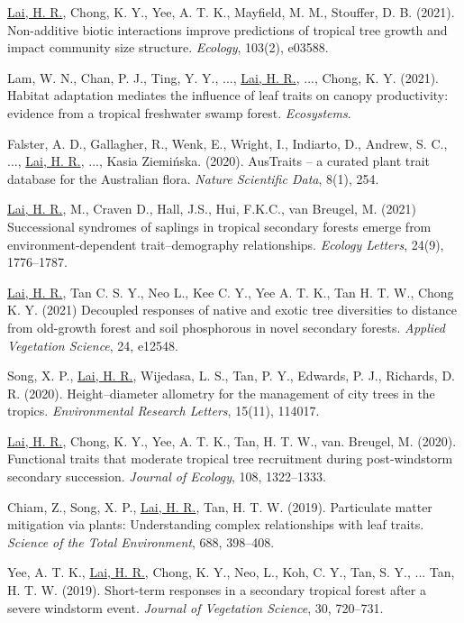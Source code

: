 \documentclass[a4paper]{article}
\begin{document}
\hangindent=1cm \underline{Lai, H. R.}, Chong, K. Y., Yee, A. T. K., Mayfield, M. M., Stouffer, D. B. (2021). Non-additive biotic interactions improve predictions of tropical tree growth and impact community size structure. \textit{Ecology}, 103(2), e03588.

\hangindent=1cm Lam, W. N., Chan, P. J., Ting, Y. Y., ..., \underline{Lai, H. R.}, ..., Chong, K. Y. (2021). Habitat adaptation mediates the influence of leaf traits on canopy productivity: evidence from a tropical freshwater swamp forest. \textit{Ecosystems}.

\hangindent=1cm Falster, A. D., Gallagher, R., Wenk, E., Wright, I., Indiarto, D., Andrew, S. C., ..., \underline{Lai, H. R.}, ..., Kasia Ziemińska. (2020). AusTraits -- a curated plant trait database for the Australian flora. \textit{Nature Scientific Data}, 8(1), 254. 

\hangindent=1cm \underline{Lai, H. R.}, M., Craven D., Hall, J.S., Hui, F.K.C., van Breugel, M. (2021) Successional syndromes of saplings in tropical secondary forests emerge from environment-dependent trait--demography relationships. \textit{Ecology Letters}, 24(9), 1776--1787.

\hangindent=1cm \underline{Lai, H. R.}, Tan C. S. Y., Neo L., Kee C. Y., Yee A. T. K., Tan H. T. W., Chong K. Y. (2021) Decoupled responses of native and exotic tree diversities to distance from old-growth forest and soil phosphorous in novel secondary forests. \textit{Applied Vegetation Science}, 24, e12548. 

\hangindent=1cm Song, X. P., \underline{Lai, H. R.}, Wijedasa, L. S., Tan, P. Y., Edwards, P. J., Richards, D. R. (2020). Height--diameter allometry for the management of city trees in the tropics. \textit{Environmental Research Letters}, 15(11), 114017.

\hangindent=1cm \underline{Lai, H. R.}, Chong, K. Y., Yee, A. T. K., Tan, H. T. W., van. Breugel, M. (2020). Functional traits that moderate tropical tree recruitment during post-windstorm secondary succession. \textit{Journal of Ecology}, 108, 1322--1333.

\hangindent=1cm Chiam, Z., Song, X. P., \underline{Lai, H. R.}, Tan, H. T. W. (2019). Particulate matter mitigation via plants: Understanding complex relationships with leaf traits. \textit{Science of the Total Environment}, 688, 398--408.

\hangindent=1cm Yee, A. T. K., \underline{Lai, H. R.}, Chong, K. Y., Neo, L., Koh, C. Y., Tan, S. Y., ... Tan, H. T. W. (2019). Short-term responses in a secondary tropical forest after a severe windstorm event. \textit{Journal of Vegetation Science}, 30, 720--731.
\end{document}
